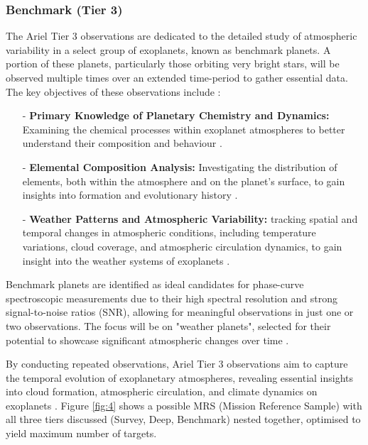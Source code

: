 \documentclass[12pt]{article}
\begin{document}
\subsubsection{Benchmark (Tier 3)} \label{sec:3.3.3}

The Ariel Tier 3 observations are dedicated to the detailed study of atmospheric variability in a select group of exoplanets, known as benchmark planets. A portion of these planets, particularly those orbiting very bright stars, will be observed multiple times over an extended time-period to gather essential data. The key objectives of these observations include \cite{salvignol2024ariel}:

\begin{itemize}
    \item[-] \textbf{Primary Knowledge of Planetary Chemistry and Dynamics:} Examining the chemical processes within exoplanet atmospheres to better understand their composition and behaviour \cite{salvignol2024ariel}.
    \item[-] \textbf{Elemental Composition Analysis:} Investigating the distribution of elements, both within the atmosphere and on the planet's surface, to gain insights into formation and evolutionary history \cite{salvignol2024ariel}.
    \item[-] \textbf{Weather Patterns and Atmospheric Variability:} tracking spatial and temporal changes in atmospheric conditions, including temperature variations, cloud coverage, and atmospheric circulation dynamics, to gain insight into the weather systems of exoplanets \cite{salvignol2024ariel}.
\end{itemize}

Benchmark planets are identified as ideal candidates for phase-curve spectroscopic measurements due to their high spectral resolution and strong signal-to-noise ratios (SNR), allowing for meaningful observations in just one or two observations.
The focus will be on "weather planets", selected for their potential to showcase significant atmospheric changes over time \cite{salvignol2024ariel}.

By conducting repeated observations, Ariel Tier 3 observations aim to capture the temporal evolution of exoplanetary atmospheres, revealing essential insights into cloud formation, atmospheric circulation, and climate dynamics on exoplanets \cite{salvignol2024ariel}.
Figure \ref{fig:4} shows a possible MRS (Mission Reference Sample) with all three tiers discussed (Survey, Deep, Benchmark) nested together, optimised to yield maximum number of targets. 
\end{document}
